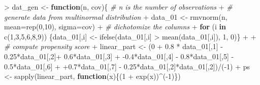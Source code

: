 \documentclass[
]{article}
\newenvironment{Shaded}{\begin{snugshade}}{\end{snugshade}}
\newcommand{\AttributeTok}[1]{\textcolor[rgb]{0.77,0.63,0.00}{#1}}
\newcommand{\CommentTok}[1]{\textcolor[rgb]{0.56,0.35,0.01}{\textit{#1}}}
\newcommand{\ControlFlowTok}[1]{\textcolor[rgb]{0.13,0.29,0.53}{\textbf{#1}}}
\newcommand{\DecValTok}[1]{\textcolor[rgb]{0.00,0.00,0.81}{#1}}
\newcommand{\FloatTok}[1]{\textcolor[rgb]{0.00,0.00,0.81}{#1}}
\newcommand{\FunctionTok}[1]{\textcolor[rgb]{0.00,0.00,0.00}{#1}}
\newcommand{\NormalTok}[1]{#1}
\newcommand{\OtherTok}[1]{\textcolor[rgb]{0.56,0.35,0.01}{#1}}
\newcommand{\SpecialCharTok}[1]{\textcolor[rgb]{0.00,0.00,0.00}{#1}}
\begin{document}
\begin{Shaded}
\begin{Highlighting}[]
\SpecialCharTok{\textgreater{}}\NormalTok{ dat\_gen }\OtherTok{\textless{}{-}} \ControlFlowTok{function}\NormalTok{(n, cov)\{ }\CommentTok{\# n is the number of observations}
\SpecialCharTok{+}   \CommentTok{\# generate data from multinormal distribution}
\SpecialCharTok{+}\NormalTok{   data\_01 }\OtherTok{\textless{}{-}} \FunctionTok{rmvnorm}\NormalTok{(n, }\AttributeTok{mean=}\FunctionTok{rep}\NormalTok{(}\DecValTok{0}\NormalTok{,}\DecValTok{10}\NormalTok{), }\AttributeTok{sigma=}\NormalTok{cov)}
\SpecialCharTok{+}   \CommentTok{\# dichotomize the columns}
\SpecialCharTok{+}   \ControlFlowTok{for}\NormalTok{ (i }\ControlFlowTok{in} \FunctionTok{c}\NormalTok{(}\DecValTok{1}\NormalTok{,}\DecValTok{3}\NormalTok{,}\DecValTok{5}\NormalTok{,}\DecValTok{6}\NormalTok{,}\DecValTok{8}\NormalTok{,}\DecValTok{9}\NormalTok{)) \{data\_01[,i] }\OtherTok{\textless{}{-}} \FunctionTok{ifelse}\NormalTok{(data\_01[,i] }\SpecialCharTok{\textgreater{}} \FunctionTok{mean}\NormalTok{(data\_01[,i]), }\DecValTok{1}\NormalTok{, }\DecValTok{0}\NormalTok{)\}}
\SpecialCharTok{+}   
\SpecialCharTok{+}   \CommentTok{\# compute propensity score }
\SpecialCharTok{+}\NormalTok{   linear\_part }\OtherTok{\textless{}{-}}\NormalTok{ (}\DecValTok{0} \SpecialCharTok{+} \FloatTok{0.8} \SpecialCharTok{*}\NormalTok{ data\_01[,}\DecValTok{1}\NormalTok{] }\SpecialCharTok{{-}} \FloatTok{0.25}\SpecialCharTok{*}\NormalTok{data\_01[,}\DecValTok{2}\NormalTok{]}\SpecialCharTok{+} \FloatTok{0.6}\SpecialCharTok{*}\NormalTok{data\_01[,}\DecValTok{3}\NormalTok{]}
\SpecialCharTok{+}                    \SpecialCharTok{{-}}\FloatTok{0.4}\SpecialCharTok{*}\NormalTok{data\_01[,}\DecValTok{4}\NormalTok{] }\SpecialCharTok{{-}} \FloatTok{0.8}\SpecialCharTok{*}\NormalTok{data\_01[,}\DecValTok{5}\NormalTok{] }\SpecialCharTok{{-}} \FloatTok{0.5}\SpecialCharTok{*}\NormalTok{data\_01[,}\DecValTok{6}\NormalTok{]}
\SpecialCharTok{+}                    \SpecialCharTok{+}\FloatTok{0.7}\SpecialCharTok{*}\NormalTok{data\_01[,}\DecValTok{7}\NormalTok{] }\SpecialCharTok{{-}} \FloatTok{0.25}\SpecialCharTok{*}\NormalTok{data\_01[,}\DecValTok{2}\NormalTok{]}\SpecialCharTok{*}\NormalTok{data\_01[,}\DecValTok{2}\NormalTok{])}\SpecialCharTok{/}\NormalTok{(}\SpecialCharTok{{-}}\DecValTok{1}\NormalTok{)}
\SpecialCharTok{+}\NormalTok{   ps }\OtherTok{\textless{}{-}} \FunctionTok{sapply}\NormalTok{(linear\_part, }\ControlFlowTok{function}\NormalTok{(x)\{(}\DecValTok{1} \SpecialCharTok{+} \FunctionTok{exp}\NormalTok{(x))}\SpecialCharTok{\^{}}\NormalTok{(}\SpecialCharTok{{-}}\DecValTok{1}\NormalTok{)\})}

\end{Highlighting}
\end{Shaded}
\end{document}
